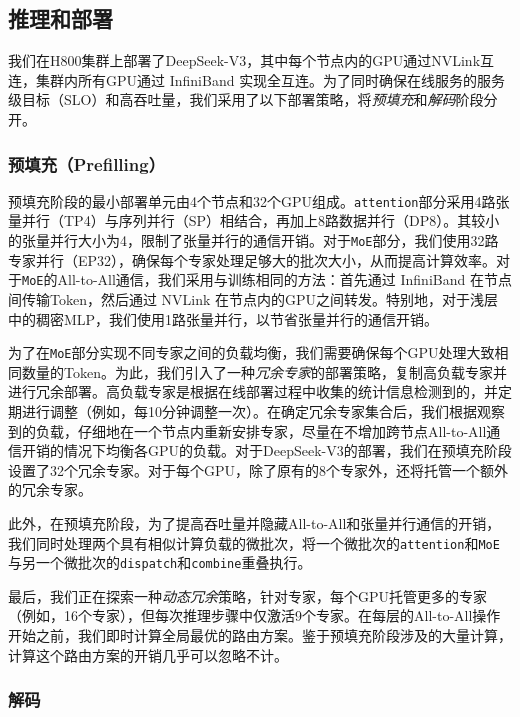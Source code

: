 \documentclass[lang=cn,a4paper,newtx]{elegantpaper}
\newcommand{\dsviii}{DeepSeek-V3}
\begin{document}
\subsection{推理和部署}
\label{sec:inference_deployment}

我们在H800集群上部署了\dsviii{}，其中每个节点内的GPU通过NVLink互连，集群内所有GPU通过 InfiniBand 实现全互连。为了同时确保在线服务的服务级目标（SLO）和高吞吐量，我们采用了以下部署策略，将\textit{预填充}和\textit{解码}阶段分开。

\subsubsection{预填充（Prefilling）}

预填充阶段的最小部署单元由4个节点和32个GPU组成。\texttt{attention}部分采用4路张量并行（TP4）与序列并行（SP）相结合，再加上8路数据并行（DP8）。其较小的张量并行大小为4，限制了张量并行的通信开销。对于\texttt{MoE}部分，我们使用32路专家并行（EP32），确保每个专家处理足够大的批次大小，从而提高计算效率。对于\texttt{MoE}的All-to-All通信，我们采用与训练相同的方法：首先通过 InfiniBand 在节点间传输Token，然后通过 NVLink 在节点内的GPU之间转发。特别地，对于浅层中的稠密MLP，我们使用1路张量并行，以节省张量并行的通信开销。

为了在\texttt{MoE}部分实现不同专家之间的负载均衡，我们需要确保每个GPU处理大致相同数量的Token。为此，我们引入了一种\textit{冗余专家}的部署策略，复制高负载专家并进行冗余部署。高负载专家是根据在线部署过程中收集的统计信息检测到的，并定期进行调整（例如，每10分钟调整一次）。在确定冗余专家集合后，我们根据观察到的负载，仔细地在一个节点内重新安排专家，尽量在不增加跨节点All-to-All通信开销的情况下均衡各GPU的负载。对于\dsviii{}的部署，我们在预填充阶段设置了32个冗余专家。对于每个GPU，除了原有的8个专家外，还将托管一个额外的冗余专家。

此外，在预填充阶段，为了提高吞吐量并隐藏All-to-All和张量并行通信的开销，我们同时处理两个具有相似计算负载的微批次，将一个微批次的\texttt{attention}和\texttt{MoE}与另一个微批次的\texttt{dispatch}和\texttt{combine}重叠执行。

最后，我们正在探索一种\textit{动态冗余}策略，针对专家，每个GPU托管更多的专家（例如，16个专家），但每次推理步骤中仅激活9个专家。在每层的All-to-All操作开始之前，我们即时计算全局最优的路由方案。鉴于预填充阶段涉及的大量计算，计算这个路由方案的开销几乎可以忽略不计。

\subsubsection{解码}
\end{document}
